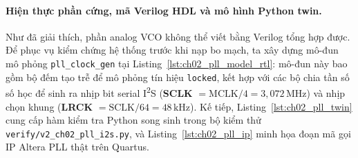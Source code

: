 \paragraph{Hiện thực phần cứng, mã Verilog HDL và mô hình Python twin.}
Như đã giải thích, phần analog VCO không thể viết bằng Verilog tổng hợp được. Để phục vụ kiểm chứng hệ thống trước khi nạp bo mạch, ta xây dựng mô-đun mô phỏng \texttt{pll\_clock\_gen} tại Listing~\ref{lst:ch02_pll_model_rtl}: mô-đun này bao gồm bộ đếm tạo trễ để mô phỏng tín hiệu \texttt{locked}, kết hợp với các bộ chia tần số số học để sinh ra nhịp bit serial I\textsuperscript{2}S (\textbf{SCLK} $= \text{MCLK} / 4 = 3{,}072\,\text{MHz}$) và nhịp chọn khung (\textbf{LRCK} $= \text{SCLK} / 64 = 48\,\text{kHz}$). Kế tiếp, Listing~\ref{lst:ch02_pll_twin} cung cấp hàm kiểm tra Python song sinh trong bộ kiểm thử \texttt{verify/v2\_ch02\_pll\_i2s.py}, và Listing~\ref{lst:ch02_pll_ip} minh họa đoạn mã gọi IP Altera PLL thật trên Quartus.

